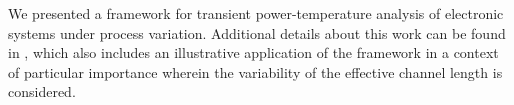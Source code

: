 We presented a framework for transient power-temperature analysis of electronic
systems under process variation. Additional details about this work can be found
in \cite{ukhov2014}, which also includes an illustrative application of the
framework in a context of particular importance wherein the variability of the
effective channel length is considered.
